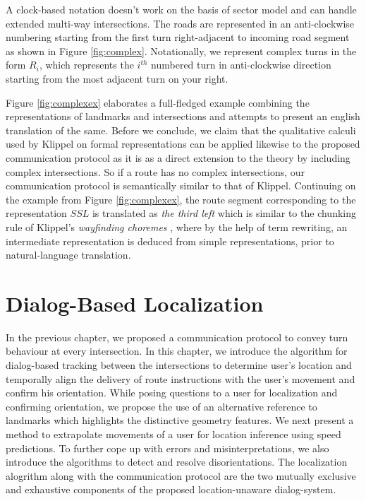\documentclass{iitkthesis}
\begin{document}
A clock-based notation doesn't work on the basis of sector model and can handle extended multi-way intersections. The roads are represented in an anti-clockwise numbering starting from the first turn right-adjacent to incoming road segment as shown in Figure \ref{fig:complex}. Notationally, we represent complex turns in the form $R_i$, which represents the $i^{th}$ numbered turn in anti-clockwise direction starting from the most adjacent turn on your right.

Figure \ref{fig:complexex} elaborates a full-fledged example combining the representations of landmarks and intersections and attempts to present an english translation of the same. Before we conclude, we claim that the qualitative calculi used by Klippel \cite{klippel} on formal representations can be applied likewise to the proposed communication protocol as it is as a direct extension to the theory by including complex intersections. So if a route has no complex intersections, our communication protocol is semantically similar to that of Klippel. Continuing on the example from Figure \ref{fig:complexex}, the route segment corresponding to the representation $SSL$ is translated as \textit{the third left} which is similar to the chunking rule of Klippel's \textit{wayfinding choremes} \cite{klippel}, where by the help of term rewriting, an intermediate representation is deduced from simple representations, prior to natural-language translation.

 \chapter{Dialog-Based Localization}

In the previous chapter, we proposed a communication protocol to convey turn behaviour at every intersection. In this chapter, we introduce the algorithm for dialog-based tracking between the intersections to determine user's location and temporally align the delivery of route instructions with the user's movement and confirm his orientation. While posing questions to a user for localization and confirming orientation, we propose the use of an alternative reference to landmarks which highlights the distinctive geometry features. We next present a method to extrapolate movements of a user for location inference using speed predictions. To further cope up with errors and misinterpretations, we also introduce the algorithms to detect and resolve disorientations. The localization alogrithm along with the communication protocol are the two mutually exclusive and exhaustive components of the proposed location-unaware dialog-system. 
\end{document}
